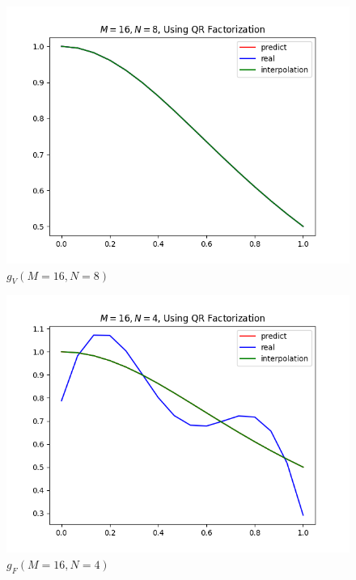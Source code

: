 \documentclass[10pt]{article}
\begin{document}
\begin{enumerate}[label=4.\arabic*]
\begin{figure}[H]
\begin{minipage}[c]{0.45\textwidth}
    		\centering
    		\includegraphics[width=1\textwidth]{./QR/M=16N=8V.png}
    		\caption{$g_V(M=16,N=8)$}
    	\end{minipage}
    \end{figure}
    \begin{figure}[H]
    	\centering
    	\begin{minipage}[c]{0.45\textwidth}
    		\centering
    		\includegraphics[width=1\textwidth]{./QR/M=16N=4F.png}
    		\caption{$g_F(M=16,N=4)$}
    	\end{minipage}
    	\begin{minipage}[c]{0.45\textwidth} 
    		\centering

\end{minipage}
\end{figure}
\end{enumerate}
\end{document}
